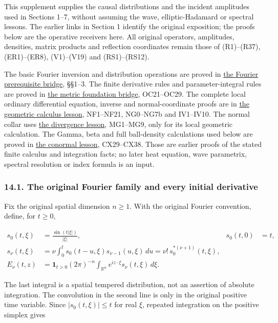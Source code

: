 \documentclass[
  11pt,
]{article}
\begin{document}
This supplement supplies the causal distributions and the incident
amplitudes used in Sections 1--7, without assuming the wave,
elliptic-Hadamard or spectral lessons. The earlier links in Section 1
identify the original exposition; the proofs below are the operative
receivers here. All original operators, amplitudes, densities, matrix
products and reflection coordinates remain those of (R1)--(R37),
(ER1)--(ER8), (V1)--(V19) and (RS1)--(RS12).

The basic Fourier inversion and distribution operations are proved in
\href{prerequisite-bridges.pdf}{the Fourier prerequisite bridge}, §§1--3.
The finite derivative rules and parameter-integral rules are proved in
\href{metric-foundation-bridges.pdf}{the metric foundation bridge},
OC21--OC29. The complete local ordinary differential equation, inverse
and normal-coordinate proofs are in
\href{geometric-microlocal-calculus.pdf}{the geometric calculus lesson},
NF1--NF21, NG0--NG7b and IV1--IV10. The normal collar uses
\href{divergence-solvability.pdf}{the divergence lesson}, MG1--MG9, only
for its local geometric calculation. The Gamma, beta and full
ball-density calculations used below are proved in
\href{conormal-transmission.pdf}{the conormal lesson}, CX29--CX38. Those
are earlier proofs of the stated finite calculus and integration facts;
no later heat equation, wave parametrix, spectral resolution or index
formula is an input.

\subsubsection{14.1. The original Fourier family and every initial
derivative}\label{the-original-fourier-family-and-every-initial-derivative}

Fix the original spatial dimension \(n\geq1\). With the original Fourier
convention, define, for \(t\geq0\),

\[
\begin{aligned}
 s_0(t,\xi)&=\frac{\sin(t|\xi|)}{|\xi|},& s_0(t,0)&=t,\\
 s_\nu(t,\xi)&=\nu\int_0^t s_0(t-u,\xi)s_{\nu-1}(u,\xi)\,du
      =\nu!\,s_0^{*(\nu+1)}(t,\xi),\\
 E_\nu(t,z)&=\boldsymbol1_{t>0}(2\pi)^{-n}
       \int_{\mathbb R^n}e^{iz\cdot\xi}s_\nu(t,\xi)\,d\xi .
\end{aligned}\tag{FW1}
\]

The last integral is a spatial tempered distribution, not an assertion
of absolute integration. The convolution in the second line is only in
the original positive time variable. Since \(|s_0(t,\xi)|\leq t\) for
real \(\xi\), repeated integration on the positive simplex gives
\end{document}
